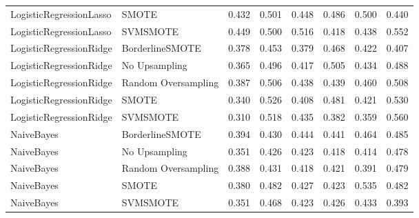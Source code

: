 \begin{tabular}{llllllll}
     LogisticRegressionLasso &               SMOTE & 0.432 &                     0.501 &                 0.448 &                  0.486 &                                   0.500 &    0.440 \\
     LogisticRegressionLasso &            SVMSMOTE & 0.449 &                     0.500 &                 0.516 &                  0.418 &                                   0.438 &    0.552 \\
     LogisticRegressionRidge &     BorderlineSMOTE & 0.378 &                     0.453 &                 0.379 &                  0.468 &                                   0.422 &    0.407 \\
     LogisticRegressionRidge &       No Upsampling & 0.365 &                     0.496 &                 0.417 &                  0.505 &                                   0.434 &    0.488 \\
     LogisticRegressionRidge & Random Oversampling & 0.387 &                     0.506 &                 0.438 &                  0.439 &                                   0.460 &    0.508 \\
     LogisticRegressionRidge &               SMOTE & 0.340 &                     0.526 &                 0.408 &                  0.481 &                                   0.421 &    0.530 \\
     LogisticRegressionRidge &            SVMSMOTE & 0.310 &                     0.518 &                 0.435 &                  0.382 &                                   0.359 &    0.560 \\
                  NaiveBayes &     BorderlineSMOTE & 0.394 &                     0.430 &                 0.444 &                  0.441 &                                   0.464 &    0.485 \\
                  NaiveBayes &       No Upsampling & 0.351 &                     0.426 &                 0.423 &                  0.418 &                                   0.414 &    0.478 \\
                  NaiveBayes & Random Oversampling & 0.388 &                     0.431 &                 0.418 &                  0.421 &                                   0.391 &    0.479 \\
                  NaiveBayes &               SMOTE & 0.380 &                     0.482 &                 0.427 &                  0.423 &                                   0.535 &    0.482 \\
                  NaiveBayes &            SVMSMOTE & 0.351 &                     0.468 &                 0.423 &                  0.426 &                                   0.433 &    0.393 \\

\end{tabular}
